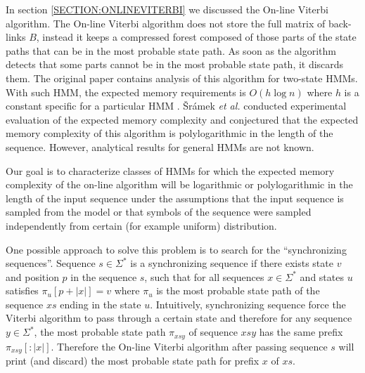 In section \ref{SECTION:ONLINEVITERBI} we discussed the  On-line Viterbi
algorithm. The On-line Viterbi algorithm does not store the full matrix of back-links
$B$, instead it keeps a compressed forest
composed of those parts of the state paths that can be in the most
probable state path. As soon as the algorithm detects that some parts cannot be
in the most probable state path, it discards them. The original paper
contains analysis of this algorithm for two-state HMMs. With such
HMM, the expected memory requirements is $O(h\log n)$ where $h$ is a constant
specific for a particular HMM \cite{Sramek2007}. Šrámek {\it et al.} conducted experimental
evaluation of the expected memory complexity and conjectured that the expected
memory complexity of this algorithm is polylogarithmic in the length of the
sequence. However, analytical results for general HMMs are not known.

Our goal is to characterize classes of HMMs for which  the expected memory
complexity of the on-line algorithm will be logarithmic or polylogarithmic in
the length of the input sequence under the assumptions that the input sequence is
sampled from the model or that symbols of the sequence were sampled
independently from certain (for example uniform) distribution.


One possible approach to solve this problem is to search for the ``synchronizing
sequences''.  
Sequence $s\in\Sigma^*$ is a synchronizing sequence if there exists
state $v$ and position $p$ in the sequence $s$, such that for all sequences
$x\in \Sigma^*$ and states $u$ satisfies $\pi_u[{p+|x|}]=v$ where $\pi_u$ is the
most probable state path of the sequence $xs$ ending
in the state $u$. Intuitively, synchronizing sequence force the Viterbi algorithm
to pass through a certain state and therefore for any sequence $y\in \Sigma^*$,
the most probable state path $\pi_{xsy}$ of sequence $xsy$ has the same prefix
$\pi_{xsy}[:|x|]$. Therefore the On-line Viterbi algorithm after passing
sequence $s$ will print (and discard) the most probable state path for prefix
$x$ of $xs$. 

